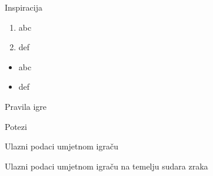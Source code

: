   \begin{frame}{Inspiracija}
  	 {
  	\begin{enumerate}
  		\item abc
  		\item def
  	\end{enumerate}
	  \begin{itemize}
	  	\item abc
	  	\item def
	  \end{itemize}
  }
  \end{frame}

  \begin{frame}{Pravila igre}
  \end{frame}

  \begin{frame}{Potezi}
  \end{frame}

  \begin{frame}{Ulazni podaci umjetnom igraču}
  \end{frame}

  \begin{frame}{Ulazni podaci umjetnom igraču na temelju sudara zraka}
  \end{frame}
